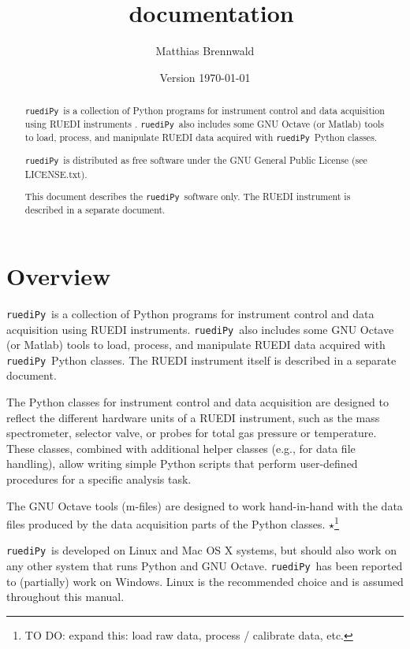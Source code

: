 \documentclass[12pt]{article}   	%
\title{\ruediPy\ documentation}
\author{Matthias Brennwald}
\date{Version \today}							%
\newcommand{\ruediPy}{\texttt{ruediPy}}
\newcommand{\work}[1]{{\Large\bf\ensuremath{\star}}\footnote{TO DO: #1}}
\begin{document}
\maketitle

\begin{abstract}
\ruediPy\ is a collection of Python programs for instrument control and data acquisition using RUEDI instruments \citep{Brennwald:2016a}. \ruediPy\ also includes some GNU Octave (or Matlab) tools to load, process, and manipulate RUEDI data acquired with \ruediPy\ Python classes.\par

\ruediPy\ is distributed as free software under the GNU General Public License (see LICENSE.txt).

This document describes the \ruediPy\ software only. The RUEDI instrument is described in a separate document\citep{Brennwald:2016a}.


\end{abstract}

\tableofcontents

\clearpage

\section{Overview}
\ruediPy\ is a collection of Python programs for instrument control and data acquisition using RUEDI instruments. \ruediPy\ also includes some GNU Octave (or Matlab) tools to load, process, and manipulate RUEDI data acquired with \ruediPy\ Python classes. The RUEDI instrument itself is described in a separate document\citep{Brennwald:2016a}.\par

The Python classes for instrument control and data acquisition are designed to reflect the different hardware units of a RUEDI instrument, such as the mass spectrometer, selector valve, or probes for total gas pressure or temperature. These classes, combined with additional helper classes (e.g., for data file handling), allow writing simple Python scripts that perform user-defined procedures for a specific analysis task.\par

The GNU Octave tools (m-files) are designed to work hand-in-hand with the data files produced by the data acquisition parts of the Python classes. \work{expand this: load raw data, process / calibrate data, etc.}

\ruediPy\ is developed on Linux and Mac OS X systems, but should also work on any other system that runs Python and GNU Octave. \ruediPy\ has been reported to (partially) work on Windows. Linux is the recommended choice and is assumed throughout this manual.\par
\end{document}
